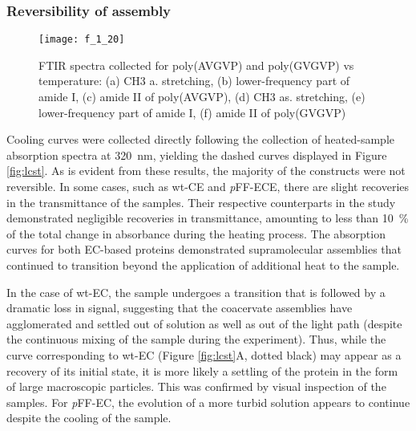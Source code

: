 \begin{refsection}
\subsubsection{Reversibility of assembly}
\label{sec:reversibility}
\begin{figure}[h!] \centering \texttt{[image: f\_1\_20]}
    \caption[FTIR spectra collected for poly(AVGVP) and poly(GVGVP) vs
        temperature: (a) CH3 a. stretching, (b) lower-frequency part of amide I,
        (c) amide II of poly(AVGVP), (d) CH3 as. stretching, (e) lower-frequency
        part of amide I, (f) amide II of poly(GVGVP)]{FTIR spectra collected for
            poly(AVGVP) and poly(GVGVP) vs temperature: (a) CH3 a. stretching,
            (b) lower-frequency part of amide I, (c) amide II of poly(AVGVP),
            (d) CH3 as. stretching, (e) lower-frequency part of amide I, (f)
            amide II of poly(GVGVP)\cite{Schmidt2005}}\label{fig:lcst_cabello}
        \end{figure}
Cooling curves were collected directly following the collection of heated-sample
absorption spectra at \SI{320}{\nm}, yielding the dashed curves displayed in
Figure \ref{fig:lcst}. As is evident from these results, the majority of the
constructs were not reversible. In some cases, such as wt-CE and \emph{p}FF-ECE,
there are slight recoveries in the transmittance of the samples. Their
respective counterparts in the study demonstrated negligible recoveries in
transmittance, amounting to less than \SI{10}{\percent} of the total change in
absorbance during the heating process. The absorption curves for both EC-based
proteins demonstrated supramolecular assemblies that continued to transition
beyond the application of additional heat to the sample.

In the case of wt-EC, the sample undergoes a transition that is followed by a
dramatic loss in signal, suggesting that the coacervate assemblies have
agglomerated and settled out of solution as well as out of the light path
(despite the continuous mixing of the sample during the experiment). Thus, while
the curve corresponding to wt-EC (Figure \ref{fig:lcst}A, dotted black) may
appear as a recovery of its initial state, it is more likely a settling of the
protein in the form of large macroscopic particles. This was confirmed by visual
inspection of the samples. For \emph{p}FF-EC, the evolution of a more turbid
solution appears to continue despite the cooling of the sample.


\end{refsection}
